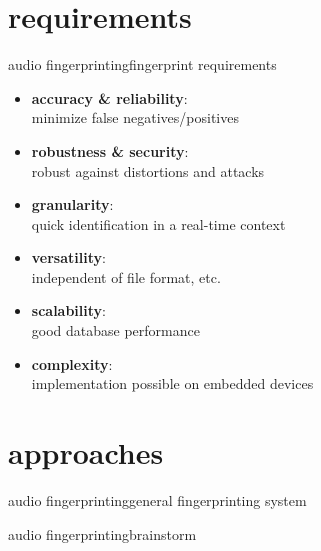     \section[requirements]{requirements}
        \begin{frame}{audio fingerprinting}{fingerprint requirements}
            \begin{itemize}%
                \item	\textbf{accuracy \& reliability}:\\ minimize false negatives/positives
                \item<2->	\textbf{robustness \& security}: \\ robust against distortions and attacks
                \item<3->	\textbf{granularity}:\\ quick identification in a real-time context
                \item<4->	\textbf{versatility}:\\ independent of file format, etc.
                \item<5->	\textbf{scalability}:\\ good database performance
                \item<6->	\textbf{complexity}:\\ implementation possible on embedded devices
            \end{itemize}
        \end{frame}
        
    \section[approaches]{approaches}
        \begin{frame}{audio fingerprinting}{general fingerprinting system}
            \begin{figure}
                \centering
                	
            \end{figure}
        \end{frame}
        \begin{frame}{audio fingerprinting}{brainstorm}
        \end{frame}
        
